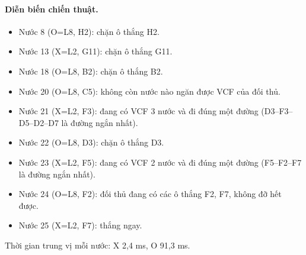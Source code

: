 \paragraph{Diễn biến chiến thuật.}
\begin{itemize}\small
\setlength{\itemsep}{0pt}
  \item Nước 8 (O=L8, H2): chặn ô thắng H2.
  \item Nước 13 (X=L2, G11): chặn ô thắng G11.
  \item Nước 18 (O=L8, B2): chặn ô thắng B2.
  \item Nước 20 (O=L8, C5): không còn nước nào ngăn được VCF của đối thủ.
  \item Nước 21 (X=L2, F3): đang có VCF 3 nước và đi đúng một đường (D3--F3--D5--D2--D7 là đường ngắn nhất).
  \item Nước 22 (O=L8, D3): chặn ô thắng D3.
  \item Nước 23 (X=L2, F5): đang có VCF 2 nước và đi đúng một đường (F5--F2--F7 là đường ngắn nhất).
  \item Nước 24 (O=L8, F2): đối thủ đang có các ô thắng F2, F7, không đỡ hết được.
  \item Nước 25 (X=L2, F7): thắng ngay.
\end{itemize}
Thời gian trung vị mỗi nước: X 2,4 ms, O 91,3 ms.
\clearpage

